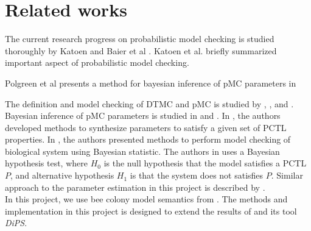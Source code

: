 \chapter{Related works}

The current research progress on probabilistic model checking is studied thoroughly by Katoen and Baier et al \cite{baier2008principles}. Katoen et al. \cite{katoen2016probabilistic} briefly summarized important aspect of probabilistic model checking.

Polgreen et al \cite{polgreen2016data} presents a method for bayesian inference of pMC parameters in


The definition and model checking of DTMC and pMC is studied by
\cite{baier2008principles}, \cite{hutschenreiter2017parametric}, and \cite{katoen2016probabilistic}.\\
Bayesian inference of pMC parameters is studied in \cite{polgreen2016data} and
\cite{jha2009bayesian}. In \cite{polgreen2016data}, the authors developed
methods to synthesize parameters to satisfy a given set of PCTL properties. In
\cite{jha2009bayesian}, the authors presented methods to perform model checking
of biological system using Bayesian statistic. The authors in
\cite{jha2009bayesian} uses a Bayesian hypothesis test, where $H_0$ is the null
hypothesis that the model satisfies a PCTL $P$, and alternative hypothesis $H_1$
is that the system does not satisfies $P$. Similar approach to the parameter
estimation in this project is described by \cite{hussain2015automated}.\\
In this project, we use bee colony model semantics from \cite{hajnal2019data}.
The methods and implementation in this project is designed to extend the results
of \cite{hajnal2019data} and its tool \textit{DiPS}.
